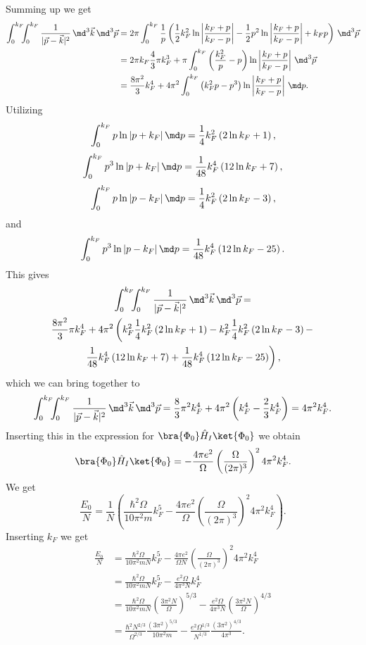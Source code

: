 Summing up we get
\begin{align*}
\int_0^{k_F} \!\!\! \int_0^{k_F} \frac{1}{|\vec p - \vec k|^2} \, \md^3 \vec k \, \md^3 \vec p &=
%
2\pi \int_0^{k_F} \frac{1}{p} \left( \frac{1}{2} k_F^2 \ln \left| \frac{k_F + p}{k_F - p} \right| - \frac{1}{2} p^2 \ln \left| \frac{k_F + p}{k_F - p} \right| + k_F p \right) \, \md^3 \vec p \\
%
&= 2\pi k_F \frac{4}{3} \pi k_F^3 + \pi \int_0^{k_F} \left( \frac{k_F^2}{p} - p \right) \ln \left| \frac{k_F + p}{k_F - p} \right| \, \md^3 \vec p \\
%
&= \frac{8\pi^2}{3} k_F^4 + 4\pi^2 \int_0^{k_F} \left( k_F^2 p - p^3 \right) \ln \left| \frac{k_F + p}{k_F - p} \right| \, \md p .
\end{align*}
Utilizing
\[ \int_0^{k_F} p \ln |p + k_F| \, \md p = \frac{1}{4} k_F^2 \left( 2\ln k_F + 1 \right), \]
%
\[ \int_0^{k_F} p^3 \ln |p + k_F| \, \md p = \frac{1}{48} k_F^4 \left( 12\ln k_F + 7 \right), \]
%
\[ \int_0^{k_F} p \ln |p - k_F| \, \md p = \frac{1}{4} k_F^2 \left( 2\ln k_F - 3 \right), \]
%
and
\[ \int_0^{k_F} p^3 \ln |p - k_F| \, \md p = \frac{1}{48} k_F^4 \left( 12\ln k_F - 25 \right). \]
This gives
\begin{multline*}
\int_0^{k_F} \!\!\! \int_0^{k_F} \frac{1}{|\vec p - \vec k|^2} \, \md^3 \vec k \, \md^3 \vec p = \\
\frac{8\pi^2}{3} \pi k_F^4 + 4\pi^2 \left( k_F^2 \frac{1}{4} k_F^2 \left( 2\ln k_F + 1 \right) - k_F^2 \frac{1}{4} k_F^2 \left( 2\ln k_F - 3 \right) - \right. \\
\left. \frac{1}{48} k_F^4 \left( 12\ln k_F + 7 \right) + \frac{1}{48} k_F^4 \left( 12\ln k_F - 25 \right) \right),
\end{multline*}
%
which we can bring together to
\[ \int_0^{k_F} \!\!\! \int_0^{k_F} \frac{1}{|\vec p - \vec k|^2} \, \md^3 \vec k \, \md^3 \vec p =
%
\frac{8}{3} \pi^2 k_F^4 + 4\pi^2 \left( k_F^4 - \frac{2}{3} k_F^4 \right) =
4\pi^2 k_F^4 . \]
%
Inserting this in the expression for $\bra{\Phi_0} \hat H_I \ket{\Phi_0}$ we obtain
\[ \bra{\Phi_0} \hat H_I \ket{\Phi_0} =
-\frac{4\pi e^2}{\Omega} \left( \frac{\Omega}{(2\pi)^3} \right)^2 4\pi^2 k_F^4 . \]
%
We get 
\[ \frac{E_0}{N} = \frac{1}{N} \left( \frac{\hbar^2 \Omega}{10\pi^2 m} k_F^5 -\frac{4\pi e^2}{\Omega} \left( \frac{\Omega}{(2\pi)^3} \right)^2 4\pi^2 k_F^4 \right) . \]
Inserting $k_F$ we get
\begin{align*}
\frac{E_0}{N} &=
%
\frac{\hbar^2 \Omega}{10\pi^2 m N} k_F^5 - \frac{4\pi e^2}{\Omega N} \left( \frac{\Omega}{(2\pi)^3} \right)^2 4\pi^2 k_F^4 \\
%
&= \frac{\hbar^2 \Omega}{10\pi^2 m N} k_F^5 - \frac{e^2 \Omega}{4\pi^3 N}k_F^4 \\
%
&= \frac{\hbar^2 \Omega}{10\pi^2 m N} \left( \frac{3\pi^2 N}{\Omega} \right)^{5/3} - \frac{e^2 \Omega}{4\pi^3 N} \left( \frac{3\pi^2 N}{\Omega} \right)^{4/3} \\
%
&= \frac{\hbar^2 N^{2/3}}{\Omega^{2/3}} \frac{(3\pi^2)^{5/3}}{10\pi^2 m} -
\frac{e^2 \Omega^{1/3}}{N^{1/3}} \frac{(3\pi^2)^{4/3}}{4\pi^3} .
\end{align*}

